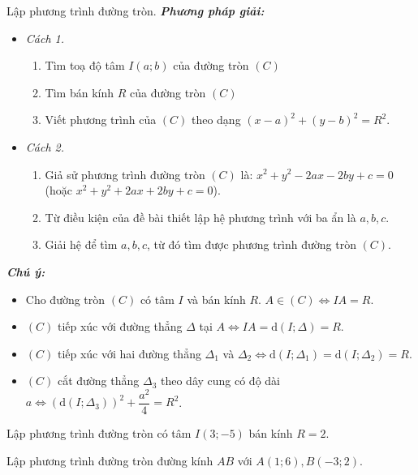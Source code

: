 	\begin{dang}{Lập phương trình đường tròn.}
		\textbf{\textit{Phương pháp giải:
		}}
		\begin{itemize}
			\item \textit{Cách 1.} 
			\begin{enumerate}[-]
				\item Tìm toạ độ tâm $I\left(a;b\right)$ của đường tròn $(C)$
				\item Tìm bán kính $R$ của đường tròn $(C)$
				\item Viết phương trình của $(C)$ theo dạng $(x-a)^2+(y-b)^2=R^2$.
			\end{enumerate}
			\item \textit{Cách 2.} 
			\begin{enumerate}[-]
				\item Giả sử phương trình đường tròn $(C)$ là: $x^2+y^2-2ax-2by+c=0 $ (hoặc $x^2+y^2+2ax+2by+c=0 $).
				\item Từ điều kiện của đề bài thiết lập hệ phương trình với ba ẩn là $a,b,c$.
				\item Giải hệ để tìm $a,b,c$, từ đó tìm được phương trình đường tròn $(C)$.
			\end{enumerate}
		\end{itemize}
		\textbf{\textit{Chú ý:}}
		\begin{itemize}
			\item Cho đường tròn $(C)$ có tâm $I$ và bán kính $R$.
			$A\in (C)\Leftrightarrow IA=R$.
			\item $(C)$ tiếp xúc với đường thẳng $\Delta $ tại $A\Leftrightarrow IA=\mathrm{d}\left(I;\Delta\right)=R$.
			\item $(C)$ tiếp xúc với hai đường thẳng ${\Delta}_1$ và ${\Delta}_2\Leftrightarrow \mathrm{d}\left(I;{\Delta}_1\right)=\mathrm{d}\left(I;{\Delta}_2\right)=R$.
			\item $(C)$ cắt đường thẳng ${\Delta}_3$ theo dây cung có độ dài $a \Leftrightarrow \left(\mathrm{d}\left(I;{\Delta}_3\right)\right)^2+\dfrac{a^2}{4}=R^2$.
		\end{itemize}
	\end{dang}
	\begin{vd}%
		Lập phương trình đường tròn có tâm $I(3;-5)$ bán kính $R=2$.
	\end{vd}
	\begin{vd}%
		Lập phương trình đường tròn đường kính $AB$ với $A\left(1;6\right),B\left(-3;2\right)$.
	\end{vd}
